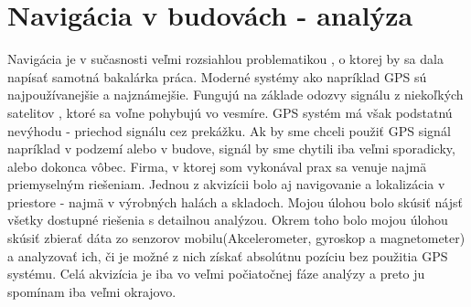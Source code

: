 \documentclass[11pt, oneside]{report}
\begin{document}
\section{Navigácia v budovách - analýza}
Navigácia je v sučasnosti veľmi rozsiahlou problematikou , o ktorej by sa dala napísať samotná bakalárka práca. Moderné systémy ako napríklad GPS  sú najpoužívanejšie a najznámejšie. Fungujú  na základe odozvy signálu z niekoľkých satelitov , ktoré sa voľne pohybujú vo vesmíre.  GPS systém  má však podstatnú nevýhodu - priechod signálu cez prekážku. Ak by sme chceli použiť GPS signál  napríklad v podzemí alebo v budove, signál by sme  chytili iba veľmi sporadicky, alebo dokonca vôbec. Firma, v ktorej som vykonával prax sa venuje najmä priemyselným riešeniam. Jednou z akvizícii bolo  aj navigovanie  a lokalizácia v priestore - najmä v výrobných  halách a skladoch. Mojou úlohou bolo skúsiť  nájsť všetky dostupné riešenia  s detailnou analýzou. Okrem toho bolo mojou úlohou skúsiť zbierať  dáta zo senzorov mobilu(Akcelerometer, gyroskop a magnetometer)  a analyzovať ich, či je možné z nich získať  absolútnu pozíciu bez použitia GPS systému. Celá akvizícia je iba vo veľmi počiatočnej fáze  analýzy a preto ju spomínam iba veľmi okrajovo. 
\end{document}
